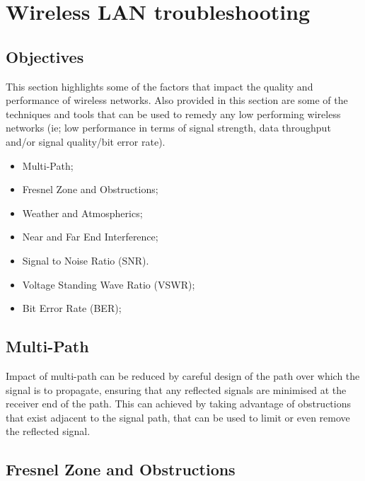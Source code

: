 \chapter{Wireless LAN troubleshooting}\label{troubleshooting}


\minitoc 

\clearpage
\section*{Objectives}
This section highlights some of the factors that impact the quality and performance of wireless networks. Also provided in this section are some of the techniques and tools that can be used to remedy any low performing wireless networks (ie; low performance in terms of signal strength, data throughput and/or signal quality/bit error rate).
  
\begin{itemize}

\item Multi-Path;

\item Fresnel Zone and Obstructions;

\item Weather and Atmospherics;

\item Near and Far End Interference;

\item Signal to Noise Ratio (SNR).

\item Voltage Standing Wave Ratio (VSWR);

\item Bit Error Rate (BER);



\end{itemize}


\section{Multi-Path}
Impact of multi-path can be reduced by careful design of the path over which the signal is to propagate, ensuring that any reflected signals are minimised at the receiver end of the path.  This can achieved by taking advantage of obstructions that exist adjacent to the signal path, that can be used to limit or even remove the reflected signal.

\section{Fresnel Zone and Obstructions}



